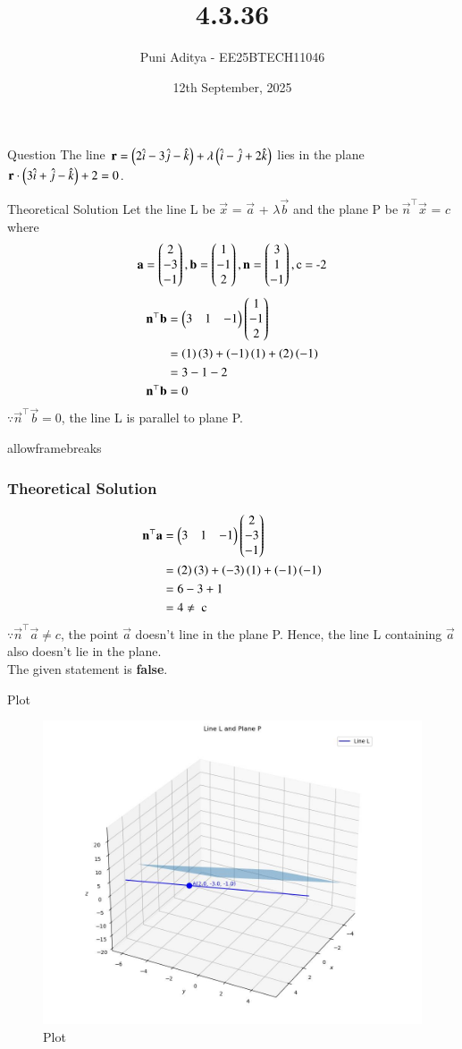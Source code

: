 \documentclass{beamer}
\title{4.3.36}
\date{12th September, 2025}
\author{Puni Aditya - EE25BTECH11046}
\begin{document}
\frame{\titlepage}
\begin{frame}{Question}
The line $\mathbf{r} = \left(2\hat{i} - 3\hat{j} - \hat{k}\right) + \lambda\left(\hat{i} - \hat{j} + 2\hat{k}\right)$ lies in the plane $\mathbf{r} \cdot \left(3\hat{i} + \hat{j} - \hat{k}\right) + 2 = 0$.
\end{frame}

\begin{frame}{Theoretical Solution}
Let the line L be $\vec{x}$ = $\vec{a}$ + $\lambda\vec{b}$ and the plane P be $\vec{n}^\top\vec{x}$ = $c$ where
\begin{align*}
    \mathbf{a} = \begin{pmatrix}2 \\ -3 \\ -1\end{pmatrix}, \mathbf{b} = \begin{pmatrix}1 \\ -1 \\ 2\end{pmatrix}, \mathbf{n} = \begin{pmatrix}3 \\ 1 \\ -1\end{pmatrix}, \text{c = -2}
\end{align*}
\begin{align}
    \mathbf{n}^\top\mathbf{b} &= \begin{pmatrix}3 & 1 & -1\end{pmatrix}\begin{pmatrix}1 \\ -1 \\ 2\end{pmatrix} \\
    &= \left(1\right)\left(3\right)+\left(-1\right)\left(1\right)+\left(2\right)\left(-1\right) \\
    &= 3-1-2 \\
    \mathbf{n}^\top\mathbf{b} &= 0
\end{align}
$\because \vec{n}^\top\vec{b} = 0$, the line L is parallel to plane P.
\end{frame}

\begin{frame}{allowframebreaks}
\frametitle{Theoretical Solution}
\begin{align}
    \mathbf{n}^\top\mathbf{a} &= \begin{pmatrix}3 & 1 & -1\end{pmatrix}\begin{pmatrix}2 \\ -3 \\ -1\end{pmatrix} \\
    &= \left(2\right)\left(3\right) + \left(-3\right)\left(1\right) + \left(-1\right)\left(-1\right) \\
    &= 6-3+1 \\
    &= 4 \neq \text{ c}
\end{align}
$\because \vec{n}^\top\vec{a} \neq c$, the point $\vec{a}$ doesn't line in the plane P. Hence, the line L containing $\vec{a}$ also doesn't lie in the plane. \\
The given statement is \textbf{false}.
\end{frame}

\begin{frame}{Plot}
    \begin{figure}
        \centering
        \includegraphics[width=0.7\columnwidth]{../figs/plot_c.jpg}
        \caption{Plot}
        \label{fig:fig}
    \end{figure}
\end{frame}
\end{document}
